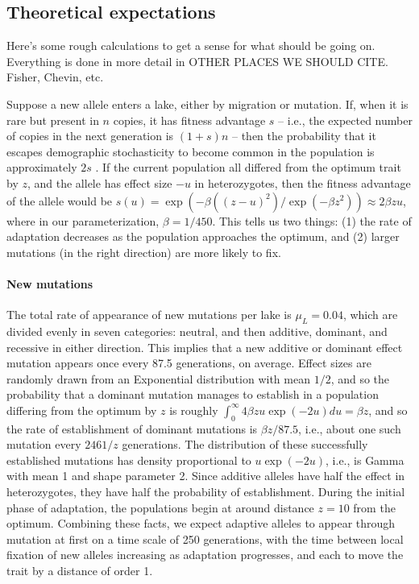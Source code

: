 \documentclass{article}
\newcommand{\plr}[1]{\todo[linecolor=blue,backgroundcolor=blue!25,bordercolor=blue]{#1}}
\begin{document}


\subsection*{Theoretical expectations}
\plr{does this go first or second?}

Here's some rough calculations to get a sense for what should be going on.
Everything is done in more detail in OTHER PLACES WE SHOULD CITE.
Fisher, Chevin, etc.

Suppose a new allele enters a lake, either by migration or mutation.
If, when it is rare but present in $n$ copies,
it has fitness advantage $s$
-- i.e., the expected number of copies in the next generation is $(1+s)n$ --
then the probability that it escapes demographic stochasticity to become common in the population
is approximately $2s$ \citep{fisher,prob_fixation}.
If the current population all differed from the optimum trait by $z$,
and the allele has effect size $-u$ in heterozygotes,
then the fitness advantage of the allele would be
$s(u) = \exp(-\beta((z - u)^2) / \exp( - \beta z^2)) \approx 2 \beta z u$,
where in our parameterization, $\beta = 1 / 450$.
This tells us two things:
(1) the rate of adaptation decreases as the population approaches the optimum,
and (2) larger mutations (in the right direction) are more likely to fix.

\paragraph{New mutations}
The total rate of appearance of new mutations per lake is $\mu_L = 0.04$,
which are divided evenly in seven categories: neutral, and then additive, dominant, and recessive
in either direction.
This implies that a new additive or dominant effect mutation appears once every 87.5 generations,
on average.
Effect sizes are randomly drawn from an Exponential distribution with mean $1/2$, 
and so the probability that a dominant mutation manages to establish in a population differing from
the optimum by $z$ is roughly
$\int_0^\infty 4 \beta z u \exp(-2u) du = \beta z$,
and so the rate of establishment of dominant mutations is $\beta z / 87.5$,
i.e., about one such mutation every $2461/z$ generations.
The distribution of these successfully established mutations 
has density proportional to $u \exp(-2u)$, i.e., is Gamma with mean 1 and shape parameter 2.
Since additive alleles have half the effect in heterozygotes,
they have half the probability of establishment.
During the initial phase of adaptation,
the populations begin at around distance $z=10$ from the optimum.
Combining these facts, we expect 
adaptive alleles to appear through mutation at first on a time scale of 250 generations,
with the time between local fixation of new alleles increasing as adaptation progresses,
and each to move the trait by a distance of order 1.
\end{document}

